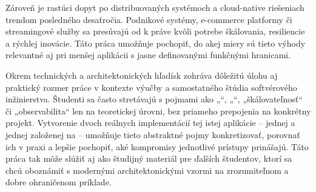 Zároveň je rastúci dopyt po distribuovaných systémoch a cloud-native riešeniach trendom posledného desaťročia. Podnikové systémy, e-commerce platformy či streamingové služby sa presúvajú od  k  práve kvôli potrebe škálovania, resiliencie a rýchlej inovácie. Táto práca umožňuje pochopiť, do akej miery sú tieto výhody relevantné aj pri menšej aplikácii s jasne definovanými funkčnými hranicami.

Okrem technických a architektonických hľadísk zohráva dôležitú úlohu aj praktický rozmer práce v kontexte výučby a samostatného štúdia softvérového inžinierstva. Študenti sa často stretávajú s pojmami ako „“, „“, „škálovateľnosť“ či „observabilita“ len na teoretickej úrovni, bez priameho prepojenia na konkrétny projekt. Vytvorenie dvoch reálnych implementácií tej istej aplikácie – jednej  a jednej založenej na  – umožňuje tieto abstraktné pojmy konkretizovať, porovnať ich v praxi a lepšie pochopiť, aké kompromisy jednotlivé prístupy prinášajú. Táto práca tak môže slúžiť aj ako študijný materiál pre ďalších študentov, ktorí sa chcú oboznámiť s modernými architektonickými vzormi na zrozumiteľnom a dobre ohraničenom príklade.